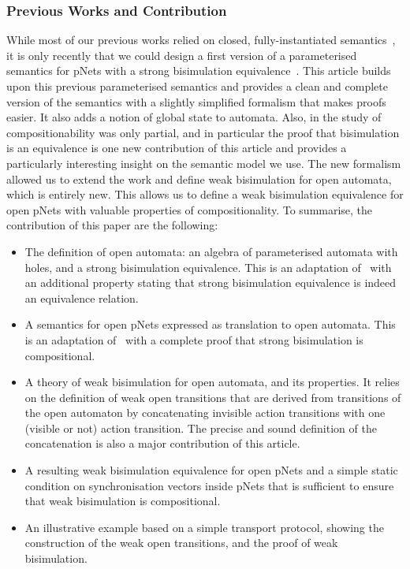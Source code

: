 \documentclass{lmcs}
\begin{document}
\subsubsection*{Previous Works and Contribution}
While most of our previous works relied on closed, fully-instantiated semantics~\cite{BBCHM:article2008,AmeurBoulifa2017,HKM-FASE16}, it is only recently that we could design a first version of a  parameterised semantics for pNets with a strong bisimulation equivalence~\cite{henrio:Forte2016}. This article builds upon this previous parameterised semantics and provides a clean and complete version of the semantics with a slightly simplified formalism that makes proofs easier. It also adds a notion of global state to automata.  Also, in \cite{henrio:Forte2016} the study of compositionability was only partial, and in particular the proof that bisimulation is an equivalence is one new contribution of this article and provides a particularly interesting insight on the semantic model we use.
The new formalism allowed us to extend the work and define weak bisimulation  for open automata, which is entirely new. This allows us to define a weak bisimulation equivalence for open pNets with valuable properties of compositionality. 
To summarise, the contribution of this paper are the following:
\begin{itemize}
\item The definition of open automata: an algebra of parameterised automata with holes, and a strong bisimulation equivalence. This is an adaptation of~\cite{henrio:Forte2016} with an additional property stating that strong bisimulation equivalence is indeed an equivalence relation.
\item A semantics for open pNets expressed as translation to open automata. This is an adaptation of~\cite{henrio:Forte2016} with a complete proof that strong bisimulation is compositional.
\item A theory of weak bisimulation for open automata, and its properties. It relies on the definition of weak open transitions that are derived from transitions of the open automaton by concatenating invisible action transitions with one (visible or not) action transition. The precise and sound definition of the concatenation is also a major contribution of this article.
\item A resulting weak bisimulation equivalence for open pNets and a simple static condition on synchronisation vectors inside pNets that is sufficient to ensure that weak bisimulation is compositional.
\item An illustrative example based on a simple transport protocol, showing the construction of the weak open transitions, and the proof of weak bisimulation.
\end{itemize}
\end{document}
